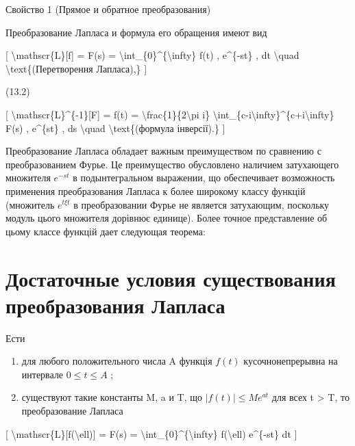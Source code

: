 \documentclass[
]{article}
\begin{document}
Свойство 1 (Прямое и обратное преобразования)

Преобразование Лапласа и формула его обращения имеют вид

{[} \textbackslash mathscr\{L\}{[}f{]} = F(s) =
\textbackslash int\_\{0\}\^{}\{\textbackslash infty\} f(t) ,
e\^{}\{-st\} , dt \textbackslash quad \textbackslash text\{(Перетворення
Лапласа),\} {]}

(13.2)

{[} \textbackslash mathscr\{L\}\^{}\{-1\}{[}F{]} = f(t) =
\textbackslash frac\{1\}\{2\textbackslash pi i\}
\textbackslash int\_\{c-i\textbackslash infty\}\^{}\{c+i\textbackslash infty\}
F(s) , e\^{}\{st\} , ds \textbackslash quad
\textbackslash text\{(формула інверсії).\} {]}

Преобразование Лапласа обладает важным преимуществом по сравнению с
преобразованием Фурье. Це преимущество обусловлено наличием затухающего
множителя \(e^{-st}\) в подынтегральном выражении, що обеспечивает
возможность применения преобразования Лапласа к более широкому классу
функцій (множитель \(e^{t\xi t}\) в преобразовании Фурье не является
затухающим, поскольку модуль цього множителя дорівнює единице). Более
точное представление об цьому классе функцій дает следующая теорема:

\section{Достаточные условия существования преобразования
Лапласа}\label{ux434ux43eux441ux442ux430ux442ux43eux447ux43dux44bux435-ux443ux441ux43bux43eux432ux438ux44f-ux441ux443ux449ux435ux441ux442ux432ux43eux432ux430ux43dux438ux44f-ux43fux440ux435ux43eux431ux440ux430ux437ux43eux432ux430ux43dux438ux44f-ux43bux430ux43fux43bux430ux441ux430}

Ести

\begin{enumerate}
\def\labelenumi{\arabic{enumi})}
\item
  для любого положительного числа A функція \(f(t)\) кусочнонепрерывна
  на интервале \(0 \le t \le A\) ;
\item
  существуют такие константы M, a и T, що \(|f(t)| \leq Me^{at}\) для
  всех t \textgreater{} T, то преобразование Лапласа
\end{enumerate}

{[} \textbackslash mathscr\{L\}{[}f(\textbackslash ell){]} = F(s) =
\textbackslash int\_\{0\}\^{}\{\textbackslash infty\}
f(\textbackslash ell) e\^{}\{-st\} dt {]}
\end{document}
